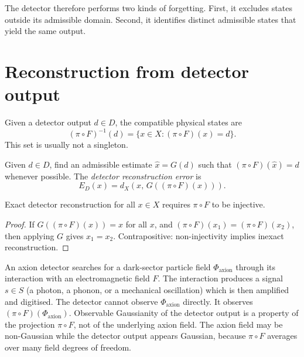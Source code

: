 The detector therefore performs two kinds of forgetting.
First, it excludes states outside its admissible domain.
Second, it identifies distinct admissible states that yield the
same output.


\section{Reconstruction from detector output}

Given a detector output $d \in D$, the compatible physical
states are
\[
  (\pi \circ F)^{-1}(d)
  = \{x \in X : (\pi \circ F)(x) = d\}.
\]
This set is usually not a singleton.

\begin{definition}
  Given $d \in D$, find an admissible estimate
  $\hat{x} = G(d)$ such that $(\pi\circ F)(\hat{x}) = d$
  whenever possible.
  The \emph{detector reconstruction error} is
  \[
    E_D(x) = d_X\!\left(x,\, G((\pi\circ F)(x))\right).
  \]
\end{definition}

\begin{proposition}
  Exact detector reconstruction for all $x \in X$ requires
  $\pi \circ F$ to be injective.
\end{proposition}

\begin{proof}
  If $G((\pi\circ F)(x)) = x$ for all $x$, and
  $(\pi\circ F)(x_1) = (\pi\circ F)(x_2)$, then applying $G$
  gives $x_1 = x_2$.
  Contrapositive: non-injectivity implies inexact
  reconstruction.
\end{proof}

\begin{example}
  An axion detector searches for a dark-sector particle field
  $\Phi_{\mathrm{axion}}$ through its interaction with an
  electromagnetic field $F$.
  The interaction produces a signal $s \in S$ (a photon, a
  phonon, or a mechanical oscillation) which is then amplified
  and digitised.
  The detector cannot observe $\Phi_{\mathrm{axion}}$ directly.
  It observes $(\pi \circ F)(\Phi_{\mathrm{axion}})$.
  Observable Gaussianity of the detector output is a property
  of the projection $\pi \circ F$, not of the underlying
  axion field.
  The axion field may be non-Gaussian while the detector output
  appears Gaussian, because $\pi \circ F$ averages over many
  field degrees of freedom.
\end{example}

